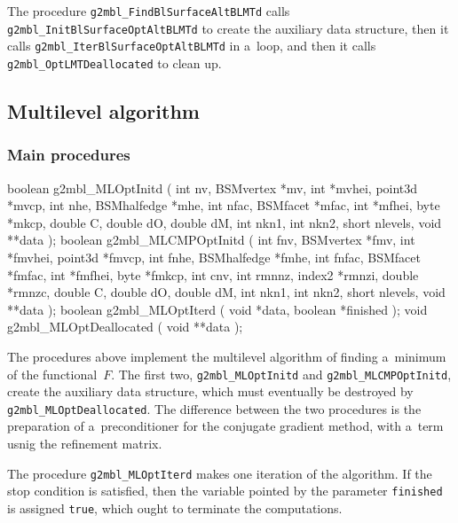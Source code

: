 The procedure \texttt{g2mbl\_FindBlSurfaceAltBLMTd} calls \\
\texttt{g2mbl\_InitBlSurfaceOptAltBLMTd} to create the auxiliary data
structure, then it calls \texttt{g2mbl\_IterBlSurfaceOptAltBLMTd} in a~loop,
and then it calls \\
\texttt{g2mbl\_OptLMTDeallocated} to clean up.


\subsection{Multilevel algorithm}

\subsubsection{Main procedures}

\begin{listingC}
boolean g2mbl_MLOptInitd (
                    int nv, BSMvertex *mv, int *mvhei, point3d *mvcp,
                    int nhe, BSMhalfedge *mhe,
                    int nfac, BSMfacet *mfac, int *mfhei,
                    byte *mkcp,
                    double C, double dO, double dM,
                    int nkn1, int nkn2, short nlevels, void **data );
boolean g2mbl_MLCMPOptInitd (
                int fnv, BSMvertex *fmv, int *fmvhei, point3d *fmvcp,
                int fnhe, BSMhalfedge *fmhe,
                int fnfac, BSMfacet *fmfac, int *fmfhei,
                byte *fmkcp,
                int cnv,
                int rmnnz, index2 *rmnzi, double *rmnzc,
                double C, double dO, double dM,
                int nkn1, int nkn2, short nlevels,
                void **data );
boolean g2mbl_MLOptIterd ( void *data, boolean *finished );
void g2mbl_MLOptDeallocated ( void **data );
\end{listingC}
The procedures above implement the multilevel algorithm of finding a~minimum
of the functional~$F$. The first two, \texttt{g2mbl\_MLOptInitd} and
\texttt{g2mbl\_MLCMPOptInitd}, create the auxiliary data structure, which
must eventually be destroyed by \\
\texttt{g2mbl\_MLOptDeallocated}. The
difference between the two procedures is the preparation of a~preconditioner
for the conjugate gradient method, with a~term usnig the refinement matrix.

The procedure \texttt{g2mbl\_MLOptIterd} makes one iteration of the
algorithm. If the stop condition is satisfied, then the variable pointed by
the parameter \texttt{finished} is assigned \texttt{true}, which ought to
terminate the computations.

